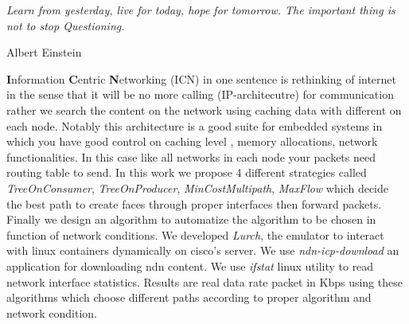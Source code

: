 \documentclass[11pt, oneside]{Thesis} %
\begin{document}
\textit{Learn from yesterday, live for today, hope for tomorrow. The important thing is not to stop Questioning.}

\begin{flushright}
Albert Einstein
\end{flushright}

\vfill\vfill\vfill\vfill\vfill\vfill\null %

\clearpage %



\abstract %
\textbf{I}nformation \textbf{C}entric \textbf{N}etworking (ICN) in one sentence is rethinking of internet in the sense that it will be no more calling (IP-architecutre) for communication rather we search the content on the network using caching data with different on each node. Notably this architecture is a good suite for embedded systems in which you have good control on caching level , memory allocations, network functionalities. In this case like all networks in each node your packets need routing table to send. In this work we propose 4 different strategies called \textit{TreeOnConsumer}, \textit{TreeOnProducer}, \textit{MinCostMultipath}, \textit{MaxFlow} which decide the best path to create faces through proper interfaces then forward packets. Finally we design an algorithm to automatize the algorithm to be chosen in function of network conditions. We developed \textit{Lurch}, the emulator to interact with linux containers dynamically on cisco's server. We use \textit{ndn-icp-download} an application for downloading ndn content. We use \textit{ifstat} linux utility to read network interface statistics.  
Results are real data rate packet in Kbps using these algorithms which choose different paths according to proper algorithm and network condition.



%
\clearpage %
\end{document}
